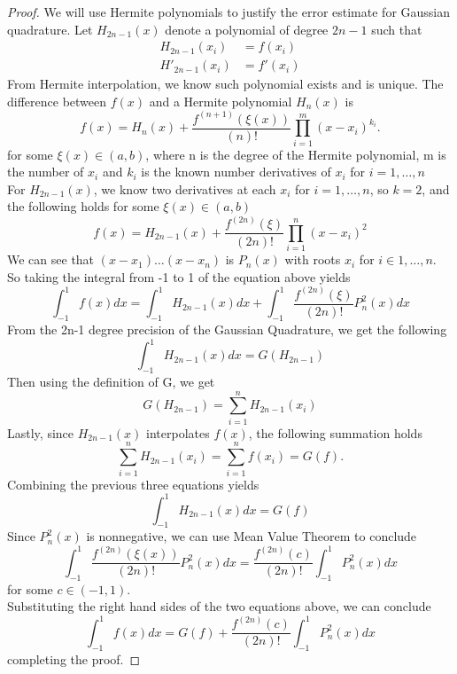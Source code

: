 \documentclass[12pt]{article}
\begin{document}
\begin{proof}
We will use Hermite polynomials to justify the error estimate for Gaussian quadrature. Let $H_{2n-1}(x)$ denote a polynomial of degree $2n - 1$ such that
\begin{align*}
    H_{2n-1}(x_i) &= f(x_i) \\
    H'_{2n-1}(x_i) &= f'(x_i)
\end{align*}
From Hermite interpolation, we know such polynomial exists and is unique.
The difference between $f(x)$ and a Hermite polynomial $H_{n}(x)$ is 
\begin{equation}
    f(x) = H_{n}(x) + \frac{f^{(n+1)}(\xi(x))}{(n)!} \prod_{i=1}^{m}(x - x_i)^{k_i}.
\end{equation}
for some $\xi(x) \in (a, b)$, where n is the degree of the Hermite polynomial, m is the number of $x_i$ and ${k_i}$ is the known number derivatives of ${x_i}$ for $i = 1, \dots, n$ \\
For $H_{2n-1}(x)$, we know two derivatives at each $x_i$ for $i = 1, \dots, n$, so $k = 2$, and the following holds for some $\xi(x) \in (a, b)$
\begin{equation}
    f(x) = H_{2n-1}(x) + \frac{f^{(2n)}(\xi)}{(2n)!} \prod_{i=1}^{n}(x - x_i)^2
\end{equation}
We can see that $(x - x_1)\dots(x - x_n)$ is $P_n(x)$ with roots $x_i$ for $i \in 1,\dots,n$. So taking the integral from -1 to 1 of the equation above yields
\begin{equation}
    \int_{-1}^{1} f(x)dx = \int_{-1}^{1} H_{2n-1}(x)dx + \int_{-1}^{1}\frac{f^{(2n)}(\xi)}{(2n)!} P_n^2(x)dx
\end{equation}
From the 2n-1 degree precision of the Gaussian Quadrature, we get the following
\begin{equation}
    \int_{-1}^{1} H_{2n-1}(x)dx = G(H_{2n-1})
\end{equation}
Then using the definition of G, we get
\begin{equation}
    G(H_{2n-1}) = \sum_{i=1}^{n} H_{2n-1}(x_i)
\end{equation}
Lastly, since $H_{2n-1}(x)$ interpolates $f(x)$, the following summation holds
\begin{equation}
   \sum_{i=1}^{n} H_{2n-1}(x_i) = \sum_{i=1}^{n} f(x_i) = G(f).
\end{equation}
Combining the previous three equations yields
\begin{equation}
    \int_{-1}^{1} H_{2n-1}(x)dx = G(f)
\end{equation}
Since $P_n^2(x)$ is nonnegative, we can use Mean Value Theorem to conclude
\begin{equation}
    \int_{-1}^{1} \frac{f^{(2n)}(\xi(x))}{(2n)!} P_n^2(x)dx = \frac{f^{(2n)}(c)}{(2n)!} \int_{-1}^{1} P_n^2(x)dx
\end{equation}
for some $c \in (-1,1)$. 
\\
Substituting the right hand sides of the two equations above, we can conclude
\begin{equation}
    \int_{-1}^{1} f(x)dx = G(f) + \frac{f^{(2n)}(c)}{(2n)!}\int_{-1}^{1} P_n^2(x)dx
\end{equation}
completing the proof.

\end{proof}
\end{document}
